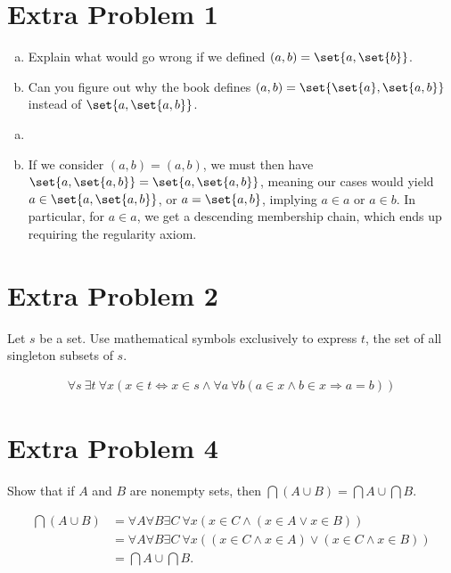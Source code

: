\documentclass[10pt]{mypackage}
\begin{document}
\section{Extra Problem 1}%
\begin{problem}\hfill
  \begin{enumerate}[(a)]
    \item Explain what would go wrong if we defined $(a,b) = \set{a,\set{b}}$.
    \item Can you figure out why the book defines $(a,b) = \set{\set{a},\set{a,b}}$ instead of $\set{a,\set{a,b}}$.
  \end{enumerate}
\end{problem}
\begin{solution}\hfill
  \begin{enumerate}[(a)]
    \item 
    \item If we consider $(a,b) = (a,b)$, we must then have $\set{a,\set{a,b}} = \set{a,\set{a,b}}$, meaning our cases would yield $a\in \set{a,\set{a,b}}$, or $a = \set{a,b}$, implying $a\in a$ or $a\in b$. In particular, for $a\in a$, we get a descending membership chain, which ends up requiring the regularity axiom.
  \end{enumerate}
\end{solution}
\section{Extra Problem 2}%
\begin{problem}
  Let $s$ be a set. Use mathematical symbols exclusively to express $t$, the set of all singleton subsets of $s$.
\end{problem}
\begin{solution}
  \begin{align*}
    \forall s\:\exists t\:\forall x\left(x\in t \Leftrightarrow x\in s \wedge \forall a\:\forall b\left(a\in x \wedge b\in x \Rightarrow a = b\right)\right)
  \end{align*}
\end{solution}
\section{Extra Problem 4}%
\begin{problem}
  Show that if $A$ and $B$ are nonempty sets, then $\bigcap\left(A\cup B\right) = \bigcap A \cup \bigcap B$.
\end{problem}
\begin{solution}
  \begin{align*}
  \bigcap\left(A\cup B\right) &= \forall A \forall B \exists C \: \forall x\left(x\in C \wedge \left(x\in A \vee x\in B\right)\right)\\
                              &= \forall A\forall B\exists C\: \forall x\left(\left(x\in C \wedge x\in A\right) \vee \left(x\in C \wedge x\in B\right)\right)\\
                              &= \bigcap A \cup \bigcap B.
  \end{align*}
\end{solution}
\end{document}

